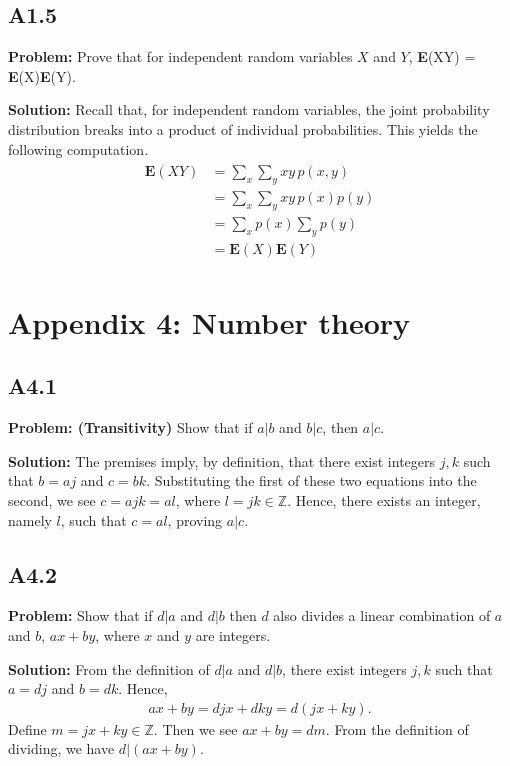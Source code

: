 \documentclass{article}
\begin{document}
\subsection*{A1.5}
\textbf{Problem:} Prove that for independent random variables $X$ and $Y$, \textbf{E}(XY) = \textbf{E}(X)\textbf{E}(Y).

\textbf{Solution:} Recall that, for independent random variables, the joint probability distribution breaks into a product of individual probabilities. This yields the following computation.
\begin{align}
\begin{aligned}
    \textbf{E}(XY) &= \sum_x\sum_y xy\,p(x,y)\\
    &= \sum_x\sum_y xy\,p(x)p(y) \\
    &= \sum_x p(x) \sum_y p(y) \\
    &= \textbf{E}(X)\textbf{E}(Y)
\end{aligned}
\end{align}

\section*{Appendix 4: Number theory}

\subsection*{A4.1}
\textbf{Problem: (Transitivity)} Show that if $a|b$ and $b|c$, then $a|c$.

\textbf{Solution:} The premises imply, by definition, that there exist integers $j, k$ such that $b = a j$ and $c = b k$. Substituting the first of these two equations into the second, we see $c = a j k = a l$, where $l = j k \in \mathbb{Z}$. Hence, there exists an integer, namely $l$, such that $c = a l$, proving $a |c$.

\subsection*{A4.2}
\textbf{Problem:} Show that if $d|a$ and $d|b$ then $d$ also divides a linear combination of $a$ and $b$, $ax+by$, where $x$ and $y$ are integers.

\textbf{Solution:} From the definition of $d|a$ and $d|b$, there exist integers $j, k $ such that $a = d j$ and $b= dk$. Hence,
\begin{align}
    ax + by = djx + dky = d(jx + ky).
\end{align}
Define $m = jx +ky \in \mathbb{Z}$. Then we see $ax + by = dm$. From the definition of dividing, we have $d|(ax+by)$. 
\end{document}
